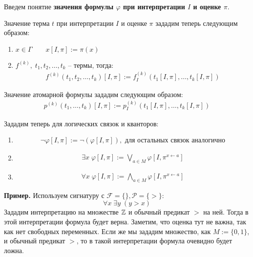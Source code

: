 \begin{conj}
    Введем понятие \textbf{значения формулы $\varphi$ при интерпретации $I$ и оценке $\pi$}.

    \quad Значение терма $t$ при интерпретации $I$ и оценке $\pi$ зададим теперь следующим образом:
    \begin{enumerate}
        \item $x \in \Gamma \qquad x[I, \pi] := \pi(x)$
        \item $f^{(k)}, \; t_1, t_2, \dots, t_k$ -- термы, тогда:
        \begin{gather*}
            f^{(k)}(t_1, t_2, \dots, t_k) [I, \pi] := f^{(k)}_I (t_1[I, \pi], \dots, t_k[I, \pi])
        \end{gather*}
    \end{enumerate}
    \quad Значение атомарной формулы зададим следующим образом:
    \begin{gather*}
        p^{(k)} (t_1, \dots, t_k)[I, \pi] := p^{(k)}_I (t_1[I, \pi], \dots, t_k[I, \pi])
    \end{gather*}

    \quad Зададим теперь для логических связок и кванторов:
    \begin{enumerate}
        \item \begin{gather*}
            \lnot \varphi [I, \pi] := \lnot (\varphi [I, \pi]), \text{ для остальных связок аналогично}
        \end{gather*}
        \item \begin{gather*}
            \exists x \; \varphi[I, \pi] := \bigvee\limits_{a \in M} \varphi [I, \pi^{x \leftarrow a}] 
        \end{gather*}
        \item \begin{gather*}
            \forall x \; \varphi[I, \pi] := \bigwedge\limits_{a \in M} \varphi [I, \pi^{x \leftarrow a}] 
        \end{gather*}
    \end{enumerate}
\end{conj}

\textbf{Пример.} Используем сигнатуру с $\mathcal{F} = \{\}, \mathcal{P} = \{>\}:$ \[ \forall x \; \exists y \; (y > x) \]
Зададим интерпретацию на множестве $\mathbb{Z}$ и обычный предикат $>$ на ней. Тогда в этой интерпретации формула будет верна. Заметим, что оценка тут не важна, так как нет свободных переменных. Если же мы зададим множество, как $M := \{0, 1\}$, и обычный предикат $>$, то в такой интерпретации формула очевидно будет ложна.


